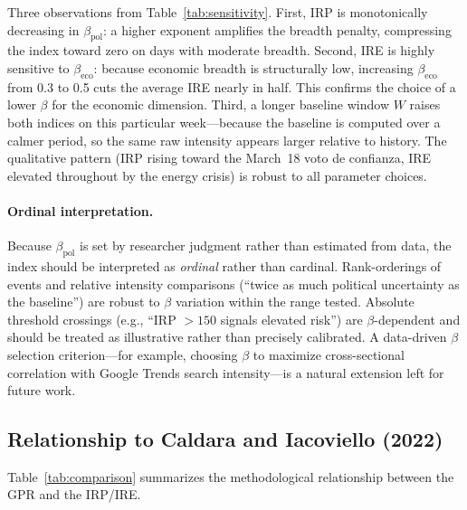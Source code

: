\documentclass[12pt,a4paper]{article}
\begin{document}
Three observations from Table~\ref{tab:sensitivity}.  First, IRP is
monotonically decreasing in $\beta_{\text{pol}}$: a higher exponent
amplifies the breadth penalty, compressing the index toward zero on days
with moderate breadth.  Second, IRE is highly sensitive to $\beta_{\text{eco}}$:
because economic breadth is structurally low, increasing $\beta_{\text{eco}}$
from 0.3 to 0.5 cuts the average IRE nearly in half.  This confirms the
choice of a lower $\beta$ for the economic dimension.  Third, a longer
baseline window $W$ raises both indices on this particular week---because
the baseline is computed over a calmer period, so the same raw intensity
appears larger relative to history.  The qualitative pattern (IRP rising
toward the March~18 voto de confianza, IRE elevated throughout by the energy
crisis) is robust to all parameter choices.

\paragraph{Ordinal interpretation.}
Because $\beta_{\text{pol}}$ is set by researcher judgment rather than
estimated from data, the index should be interpreted as \emph{ordinal}
rather than cardinal.  Rank-orderings of events and relative intensity
comparisons (``twice as much political uncertainty as the baseline'') are
robust to $\beta$ variation within the range tested.  Absolute threshold
crossings (e.g., ``IRP $> 150$ signals elevated risk'') are $\beta$-dependent
and should be treated as illustrative rather than precisely calibrated.  A
data-driven $\beta$ selection criterion---for example, choosing $\beta$ to
maximize cross-sectional correlation with Google Trends search intensity---is
a natural extension left for future work.

\subsection{Relationship to Caldara and Iacoviello (2022)}
\label{subsec:ci_comparison}

Table~\ref{tab:comparison} summarizes the methodological relationship
between the GPR and the IRP/IRE.
\end{document}
